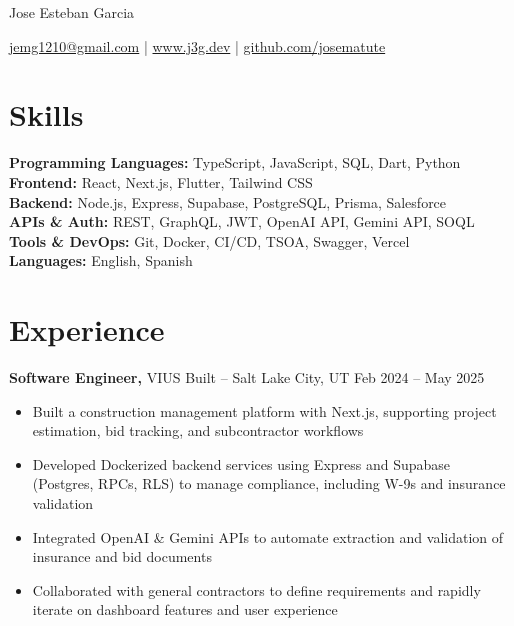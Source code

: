 \documentclass[11pt]{article}       %
\begin{document}
\centerline{\Huge Jose Esteban Garcia}

\vspace{5pt}

\centerline{\href{mailto:jemg1210@gmail.com}{jemg1210@gmail.com} | \href{https://www.j3g.dev}{www.j3g.dev} | \href{https://github.com/josematute}{github.com/josematute}}

\vspace{-10pt}

\section*{Skills}
\textbf{Programming Languages:} TypeScript, JavaScript, SQL, Dart, Python \\
\textbf{Frontend:} React, Next.js, Flutter, Tailwind CSS \\
\textbf{Backend:} Node.js, Express, Supabase, PostgreSQL, Prisma, Salesforce \\
\textbf{APIs \& Auth:} REST, GraphQL, JWT, OpenAI API, Gemini API, SOQL \\
\textbf{Tools \& DevOps:} Git, Docker, CI/CD, TSOA, Swagger, Vercel \\
\textbf{Languages:} English, Spanish

\vspace{-6.5pt}

\section*{Experience}
\textbf{Software Engineer,} VIUS Built -- Salt Lake City, UT \hfill Feb 2024 -- May 2025 \\
\vspace{-9pt}
\begin{itemize}
  \item Built a construction management platform with Next.js, supporting project estimation, bid tracking, and subcontractor workflows
  \item Developed Dockerized backend services using Express and Supabase (Postgres, RPCs, RLS) to manage compliance, including W-9s and insurance validation
  \item Integrated OpenAI \& Gemini APIs to automate extraction and validation of insurance and bid documents
  \item Collaborated with general contractors to define requirements and rapidly iterate on dashboard features and user experience
\end{itemize}
\end{document}
